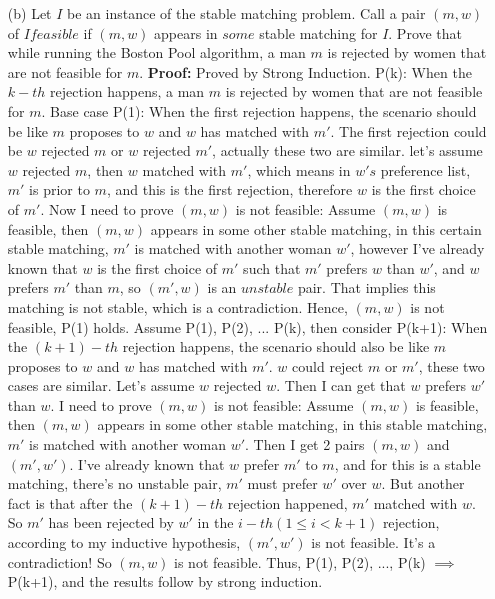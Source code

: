 \documentclass{article}       %
\begin{document}
\begin{enumerate}
\begin{enumerate}
                \item[(b)] Let $I$ be an instance of the stable matching problem. Call a pair $(m,w)$ of $I feasible$ if $(m,w)$ appears in $some$ stable matching for $I$. Prove that while running the Boston Pool algorithm, a man $m$ is rejected by women that are not feasible for $m$.\newline\newline
                \textbf{Proof:} Proved by Strong Induction.\newline
                P(k): When the $k-th$ rejection happens, a man $m$ is rejected by women that are not feasible for $m$. \newline\newline
                Base case P(1): \newline
                When the first rejection happens, the scenario should be like $m$ proposes to $w$ and $w$ has matched with $m'$. The first rejection could be $w$ rejected $m$ or $w$ rejected $m'$, actually these two are similar.  let's assume $w$ rejected $m$, then $w$ matched with $m'$, which means in $w's$ preference list, $m'$ is prior to $m$, and this is the first rejection, therefore $w$ is the first choice of $m'$. Now I need to prove $(m, w)$ is not feasible: \newline
                Assume $(m, w)$ is feasible, then $(m, w)$ appears in some other stable matching, in this certain stable matching, $m'$ is matched with another woman $w'$, however I've already known that $w$ is the first choice of $m'$ such that $m'$ prefers $w$ than $w'$, and $w$ prefers $m'$ than $m$, so $(m',w)$ is an $unstable$ pair. That implies this matching is not stable, which is a contradiction. Hence, $(m, w)$ is not feasible, P(1) holds.\newline\newline
                Assume P(1), P(2), ... P(k), then consider P(k+1): \newline
                When the $(k+1)-th$ rejection happens, the scenario should also be like $m$ proposes to $w$ and $w$ has matched with $m'$. $w$ could reject $m$ or  $m'$, these two cases are similar. Let's assume $w$ rejected $w$. Then I can get that $w$ prefers $w'$ than $w$. I need to prove $(m, w)$ is not feasible: \newline
                Assume $(m, w)$ is feasible, then $(m, w)$ appears in some other stable matching, in this stable matching, $m'$ is matched with another woman $w'$. Then I get 2 pairs $(m, w)$ and $(m', w')$. I've already known that $w$ prefer $m'$ to $m$, and for this is a stable matching, there's no unstable pair, $m'$ must prefer $w'$ over $w$. But another fact is that after the $(k+1)-th$ rejection happened, $m'$ matched with $w$. So $m'$ has been rejected by $w'$ in the $i-th(1 \leq i < k+1)$ rejection, according to my inductive hypothesis, $(m', w')$ is not feasible. It's a contradiction! So $(m, w)$ is not feasible.\newline
                Thus, P(1), P(2), ..., P(k) $\implies$ P(k+1), and the results follow by strong induction.\newline
                

\end{enumerate}
\end{enumerate}
\end{document}
